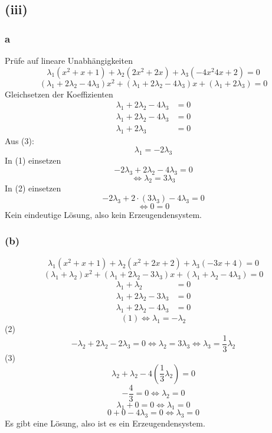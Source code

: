 \documentclass{article}
\begin{document}
\subsection*{(iii)}
\subsubsection*{a}
Prüfe auf lineare Unabhängigkeiten
\[\lambda_1(x^2 + x + 1) + \lambda_2(2x^2 + 2x) + \lambda_3(-4x^2  4x + 2) = 0\]
\[(\lambda_1 + 2 \lambda_2 - 4 \lambda_3)x^2 + (\lambda_1 + 2 \lambda_2 - 4\lambda_3)x + (\lambda_1 + 2 \lambda_3) = 0\]
Gleichsetzen der Koeffizienten
\begin{align}
    \lambda_1 + 2 \lambda_2 - 4 \lambda_3 &= 0 \\
    \lambda_1 + 2 \lambda_2 - 4 \lambda_3 &= 0 \\
    \lambda_1 + 2 \lambda_3 &= 0 
\end{align}
Aus (3):
\[\lambda_1 = -2 \lambda_3\]
In (1) einsetzen
\[-2 \lambda_3 + 2 \lambda_2 - 4 \lambda_3 = 0\]
\[\Leftrightarrow \lambda_2 = 3 \lambda_3\]
In (2) einsetzen
\[-2 \lambda_3 + 2 \cdot (3 \lambda_3) - 4 \lambda_3 = 0\]
\[\Leftrightarrow 0 = 0\]
Kein eindeutige Lösung, also kein Erzeugendensystem.

\subsubsection*{(b)}
\[\lambda_1(x^2 + x + 1) + \lambda_2 (x^2 + 2x + 2) + \lambda_3(-3x + 4) = 0\]
\[(\lambda_1 + \lambda_2)x^2 + (\lambda_1 + 2 \lambda_2 - 3 \lambda_3)x + (\lambda_1 + \lambda_2 - 4 \lambda_3) = 0\]
\begin{align}
    \lambda_1 + \lambda_2 &= 0 \\
    \lambda_1 + 2\lambda_2 - 3 \lambda_3 &= 0 \\
    \lambda_1 + 2\lambda_2 - 4 \lambda_3 &= 0 
\end{align}
\[(1) \Leftrightarrow \lambda_1 = - \lambda_2\]
(2)
\[-\lambda_2 + 2 \lambda_2 - 2 \lambda_3 = 0 \Leftrightarrow \lambda_2 = 3 \lambda_3 \Leftrightarrow \lambda_3 = \frac{1}{3} \lambda_2\]
(3)
\[\lambda_2 + \lambda_2 - 4 (\frac{1}{3} \lambda_2) = 0\]
\[-\frac{4}{3} = 0 \Leftrightarrow \lambda_2 = 0\]
\[\lambda_1 + 0 = 0 \Leftrightarrow \lambda_1 = 0\]
\[0 + 0 - 4 \lambda_3 = 0 \Leftrightarrow \lambda_3 = 0\]
Es gibt eine Lösung, also ist es ein Erzeugendensystem.
\end{document}
